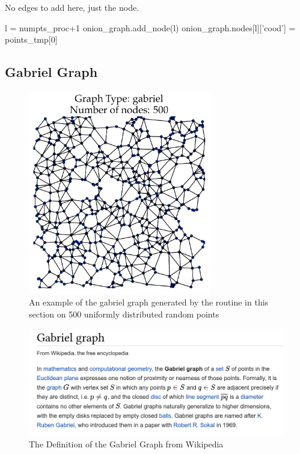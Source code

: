 No edges to add here, just the node. 

\nwenddocs{}\endmoddef\nwstartdeflinemarkup{}\nwenddeflinemarkup
l = numpts_proc+1 
onion_graph.add_node(l)
onion_graph.nodes[l]['cood'] = points_tmp[0]
\nwendcode{}\nwdocspar

\subsection{Gabriel Graph}

\begin{figure}[ht]
  \centering
  \includegraphics[width=8cm]{./miscimages/gabriel-graph-example.png}
  \caption{\label{fig:gabriel-example} An example of the gabriel graph generated by the routine in this section on 500 uniformly distributed random points}
\end{figure}



\begin{figure}[H]
  \centering
  \includegraphics[width=12cm]{miscimages/gabriel-definition.png}
  \caption{\label{fig:gabriel-defn} The Definition of the Gabriel Graph from Wikipedia}
\end{figure}



